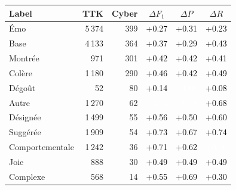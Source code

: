 \begin{tabular}{lrrccc}
\toprule
\textbf{Label} & \textbf{TTK} & \textbf{Cyber} & \textbf{$\Delta F_1$} & \textbf{$\Delta P$} & \textbf{$\Delta R$} \\
\midrule
Émo & 5\,374 & 399 & \cellcolor[HTML]{C7EA97}\textcolor{black}{+0.27} & \cellcolor[HTML]{CFEB8F}\textcolor{black}{+0.31} & \cellcolor[HTML]{C0EAA1}\textcolor{black}{+0.23} \\
Base & 4\,133 & 364 & \cellcolor[HTML]{E6EC7E}\textcolor{black}{+0.37} & \cellcolor[HTML]{CBEA92}\textcolor{black}{+0.29} & \cellcolor[HTML]{EEDA6E}\textcolor{black}{+0.43} \\
Montrée & 971 & 301 & \cellcolor[HTML]{EEE172}\textcolor{black}{+0.42} & \cellcolor[HTML]{EEDF71}\textcolor{black}{+0.42} & \cellcolor[HTML]{EEE373}\textcolor{black}{+0.41} \\
Colère & 1\,180 & 290 & \cellcolor[HTML]{EFCD67}\textcolor{black}{+0.46} & \cellcolor[HTML]{EEDF71}\textcolor{black}{+0.42} & \cellcolor[HTML]{F1BB5E}\textcolor{black}{+0.49} \\
Dégoût & 52 & 80 & \cellcolor[HTML]{BBEAB5}\textcolor{black}{+0.14} & \cellcolor[HTML]{B62020}\textcolor{white}{+1.00} & \cellcolor[HTML]{C3ECC9}\textcolor{black}{+0.08} \\
Autre & 1\,270 & 62 & \cellcolor[HTML]{E4602C}\textcolor{white}{+0.76} & \cellcolor[HTML]{E25727}\textcolor{white}{+0.78} & \cellcolor[HTML]{E97B39}\textcolor{black}{+0.68} \\
Désignée & 1\,499 & 55 & \cellcolor[HTML]{EFA24F}\textcolor{black}{+0.56} & \cellcolor[HTML]{F1B55B}\textcolor{black}{+0.50} & \cellcolor[HTML]{ED9447}\textcolor{black}{+0.60} \\
Suggérée & 1\,909 & 54 & \cellcolor[HTML]{E5682F}\textcolor{black}{+0.73} & \cellcolor[HTML]{E97C3A}\textcolor{black}{+0.67} & \cellcolor[HTML]{E5642D}\textcolor{black}{+0.74} \\
Comportementale & 1\,242 & 36 & \cellcolor[HTML]{E77134}\textcolor{black}{+0.71} & \cellcolor[HTML]{EC9044}\textcolor{black}{+0.62} & \cellcolor[HTML]{E4602C}\textcolor{white}{+0.76} \\
Joie & 888 & 30 & \cellcolor[HTML]{F1BA5D}\textcolor{black}{+0.49} & \cellcolor[HTML]{F1B95D}\textcolor{black}{+0.49} & \cellcolor[HTML]{F1BB5E}\textcolor{black}{+0.49} \\
Complexe & 568 & 14 & \cellcolor[HTML]{EFA451}\textcolor{black}{+0.55} & \cellcolor[HTML]{E87637}\textcolor{black}{+0.69} & \cellcolor[HTML]{CDEB90}\textcolor{black}{+0.30} \\

\end{tabular}
